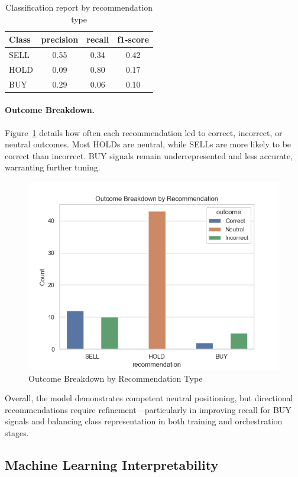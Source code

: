 \begin{table}[htbp]
\centering
\caption{Classification report by recommendation type}
\label{tab:classification-report}
\begin{tabular}{lccc}
\hline
\textbf{Class} & \textbf{precision} & \textbf{recall} & \textbf{f1-score} \\
\hline
SELL & 0.55 & 0.34 & 0.42 \\
HOLD & 0.09 & 0.80 & 0.17 \\
BUY  & 0.29 & 0.06 & 0.10 \\
\hline
\end{tabular}
\end{table}

\FloatBarrier

\paragraph{Outcome Breakdown.}  
Figure~\ref{fig:outcome_breakdown} details how often each recommendation led to correct, incorrect, or neutral outcomes. Most HOLDs are neutral, while SELLs are more likely to be correct than incorrect. BUY signals remain underrepresented and less accurate, warranting further tuning.

\begin{figure}[h]
  \centering
  \includegraphics[width=0.6\linewidth]{assets/outcome_breakdown_by_recommendation.png}
  \caption{Outcome Breakdown by Recommendation Type}
  \label{fig:outcome_breakdown}
\end{figure}

Overall, the model demonstrates competent neutral positioning, but directional recommendations require refinement—particularly in improving recall for BUY signals and balancing class representation in both training and orchestration stages.

\subsection{Machine Learning Interpretability}

